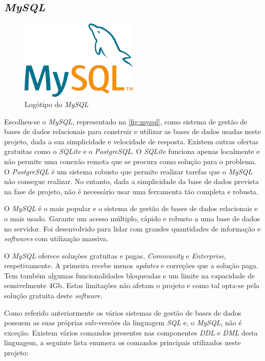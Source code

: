 \documentclass[11pt,twoside,a4paper]{report}
\begin{document}
\subsection{\textit{MySQL}}
\label{subchap:mysql}
\begin{figure}[H]
	\begin{center}
		\includegraphics[width=0.5\textwidth]{mysql} %
		\caption{Logótipo do \textit{MySQL}}
		\label{fig:mysql}
	\end{center}
\end{figure}
Escolheu-se o \textit{MySQL}, representado na \autoref{fig:mysql}, como sistema de gestão de bases de dados relacionais para construir e utilizar as bases de dados usadas neste projeto, dada a sua simplicidade e velocidade de resposta. Existem outras ofertas gratuitas como o \textit{SQLite} e o \textit{PostgreSQL}. O \textit{SQLite} funciona apenas localmente e não permite uma conexão remota que se procura como solução para o problema. O \textit{PostgreSQL} é um sistema robusto que permite realizar tarefas que o \textit{MySQL} não consegue realizar. No entanto, dada a simplicidade da base de dados prevista na fase de projeto, não é necessário usar uma ferramenta tão completa e robusta\cite{mysqlvs}.\par 
O \textit{MySQL} é o mais popular e o sistema de gestão de bases de dados relacionais e o mais usado\cite{mysqlvs}. Garante um acesso múltiplo, rápido e robusto a uma base de dados no servidor. Foi desenvolvido para lidar com grandes quantidades de informação e \textit{softwares} com utilização massiva\cite{mysql}.\par 
O \textit{MySQL} oferece soluções gratuitas e pagas, \textit{Community} e \textit{Enterprise}, respetivamente. A primeira recebe menos \textit{updates} e correções que a solução paga. Tem também algumas funcionalidades bloqueadas e um limite na capacidade de sensivelmente 4Gb\cite{mysql}. Estas limitações não afetam o projeto e como tal opta-se pela solução gratuita deste \textit{software}.\par
Como referido anteriormente os vários sistemas de gestão de bases de dados possuem as suas próprias sub-versões da linguagem \textit{SQL} e, o \textit{MySQL}, não é exceção. Existem vários comandos presentes nas componentes \textit{DDL} e \textit{DML} desta linguagem, a seguinte lista enumera os comandos principais utilizados neste projeto:
\end{document}

